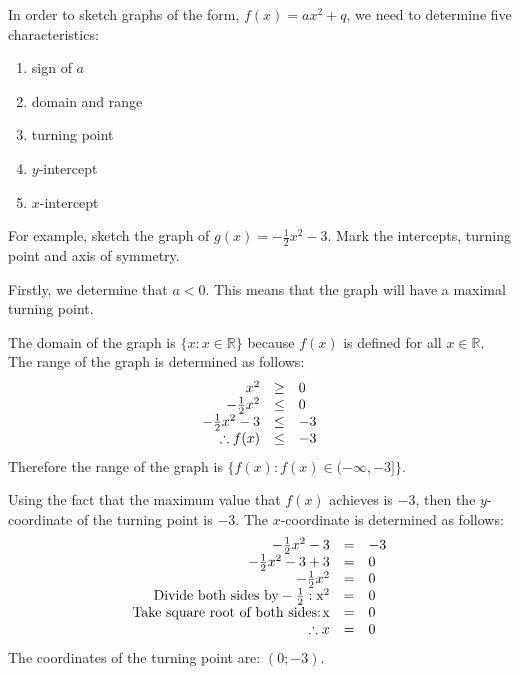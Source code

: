 In order to sketch graphs of the form, $f(x)=a{x}^{2}+q$, we need to determine five characteristics:
\begin{enumerate}[noitemsep, label=\textbf{\arabic*}. ] 
\item sign of $a$
\item domain and range
\item turning point
\item $y$-intercept
\item $x$-intercept
\end{enumerate}
For example, sketch the graph of $g(x)=-\frac{1}{2}{x}^{2}-3$. Mark the intercepts, turning point and axis of symmetry.\par 
Firstly, we determine that $a<0$. This means that the graph will have a maximal turning point.\par 
The domain of the graph is $\{x:x\in \mathbb{R}\}$ because $f(x)$ is defined for all $x\in \mathbb{R}$. The range of the graph is determined as follows:
\begin{equation*}
\begin{array}{ccc}\hfill {x}^{2}& \ge & 0\hfill \\
 \hfill -\frac{1}{2}{x}^{2}& \le & 0\hfill \\
 \hfill -\frac{1}{2}{x}^{2}-3& \le & -3\hfill \\
 \hfill \therefore f(x)& \le & -3\hfill \end{array}
\end{equation*}
Therefore the range of the graph is $\{f(x):f(x)\in (-\infty ,-3]\}$.\par 
Using the fact that the maximum value that $f(x)$ achieves is $-3$, then the $y$-coordinate of the turning point is $-3$. The $x$-coordinate is determined as follows:
\begin{equation*}
\begin{array}{ccc}\hfill -\frac{1}{2}{x}^{2}-3& =& -3\hfill \\
 \hfill -\frac{1}{2}{x}^{2}-3+3& =& 0\hfill \\
 \hfill -\frac{1}{2}{x}^{2}& =& 0\hfill \\
 \hfill \mbox{Divide both sides by}-\frac{1}{2}:{\mbox{x}}^{2}& =& 0\hfill \\
 \hfill \mbox{Take square root of both sides:}\phantom{\rule{1.pt}{0ex}}\mathrm{x}& =& 0\hfill \\
 \hfill \therefore x& =& 0\hfill 
\end{array}
\end{equation*}
The coordinates of the turning point are: $(0;-3)$.\par 
